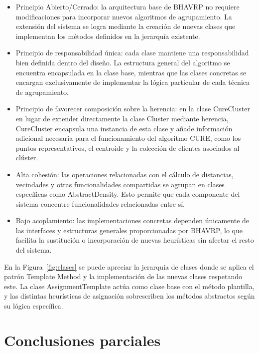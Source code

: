 \begin{itemize}
  \item Principio Abierto/Cerrado: la arquitectura base de BHAVRP no requiere modificaciones para incorporar nuevos algoritmos de agrupamiento. La extensi\'on del sistema se logra mediante la creaci\'on de nuevas clases que implementan los m\'etodos definidos en la jerarqu\'ia existente.
  \item Principio de responsabilidad \'unica: cada clase mantiene una responsabilidad bien definida dentro del dise\~no. La estructura general del algoritmo se encuentra encapsulada en la clase base, mientras que las clases concretas se encargan exclusivamente de implementar la l\'ogica particular de cada t\'ecnica de agrupamiento.
  \item Principio de favorecer composici\'on sobre la herencia: en la clase CureCluster en lugar de extender directamente la clase Cluster mediante herencia, CureCluster encapsula una instancia de esta clase y a\~nade informaci\'on adicional necesaria para el funcionamiento del algoritmo CURE, como los puntos representativos, el centroide y la colecci\'on de clientes asociados al cl\'uster.
  \item Alta cohesi\'on: las operaciones relacionadas con el c\'alculo de distancias, vecindades y otras funcionalidades compartidas se agrupan en clases espec\'ificas como AbstractDensity. Esto permite que cada componente del sistema concentre funcionalidades relacionadas entre s\'i.
  \item Bajo acoplamiento: las implementaciones concretas dependen \'unicamente de las interfaces y estructuras generales proporcionadas por BHAVRP, lo que facilita la sustituci\'on o incorporaci\'on de nuevas heur\'isticas sin afectar el resto del sistema.
\end{itemize}

En la Figura~\ref{fig:clases} se puede apreciar la jerarqu\'ia de clases donde se aplica el patr\'on Template Method y la implementaci\'on de las nuevas clases respetando este. La clase AssignmentTemplate act\'ua como clase base con el m\'etodo plantilla, y las distintas heur\'isticas de asignaci\'on sobrescriben los m\'etodos abstractos seg\'un su l\'ogica espec\'ifica.


\section{Conclusiones parciales}

